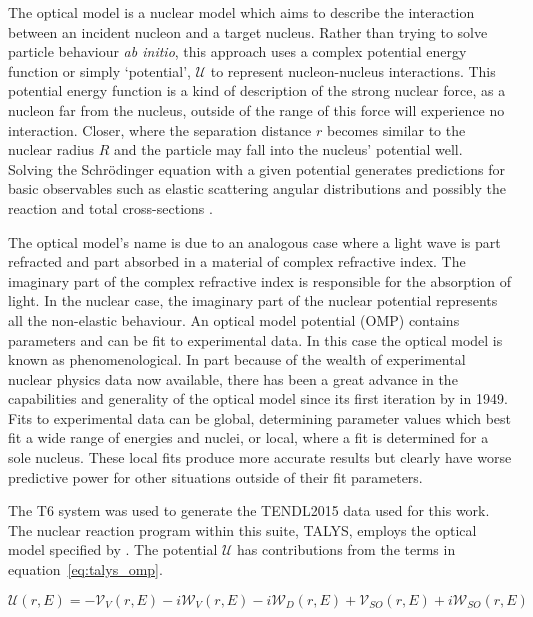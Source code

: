The optical model is a nuclear model which aims to describe the interaction between an incident nucleon and a target nucleus. Rather than trying to solve particle behaviour \textit{ab initio}, this approach uses a complex potential energy function or simply `potential', $\mathcal{U}$ to represent nucleon-nucleus interactions. This potential energy function is a kind of description of the strong nuclear force, as a nucleon far from the nucleus, outside of the range of this force will experience no interaction. Closer, where the separation distance $r$ becomes similar to the nuclear radius $R$ and the particle may fall into the nucleus' potential well. Solving the Schr\"odinger equation with a given potential generates predictions for basic observables such as elastic scattering angular distributions and possibly the reaction and total cross-sections \cite{Hodgson1971}. 

The optical model's name is due to an analogous case where a light wave is part refracted and part absorbed in a material of complex refractive index. The imaginary part of the complex refractive index is responsible for the absorption of light. In the nuclear case, the imaginary part of the nuclear potential represents all the non-elastic behaviour. An optical model potential (OMP) contains parameters and can be fit to experimental data. In this case the optical model is known as phenomenological. In part because of the wealth of experimental nuclear physics data now available, there has been a great advance in the capabilities and generality of the optical model since its first iteration by \citeauthor{Fernbach1949} in 1949. Fits to experimental data can be global, determining parameter values which best fit a wide range of energies and nuclei, or local, where a fit is determined for a sole nucleus. These local fits produce more accurate results but clearly have worse predictive power for other situations outside of their fit parameters.

The T6 system was used to generate the TENDL2015 data used for this work. The nuclear reaction program within this suite, TALYS, employs the optical model specified by \citeauthor{Koning2003}. The potential $\mathcal{U}$ has contributions from the terms in equation~\ref{eq:talys_omp}. 

\begin{equation}
  \mathcal{U}(r,E) = - \mathcal{V}_{V}(r,E) - i\mathcal{W}_{V}(r,E) - i\mathcal{W}_{D}(r,E) + \mathcal{V}_{SO}(r,E) + i\mathcal{W}_{SO}(r,E)
  \label{eq:talys_omp}
\end{equation}

